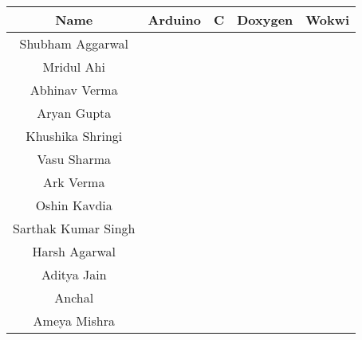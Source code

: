 \begin{center}
\label{table:competency_apd}
\begin{longtable}{|c|c|p{1.2cm}|c|c|}
\hline
Name                & Arduino                  & C                        & Doxygen                  & Wokwi                    \\ \hline
Shubham Aggarwal    & \cellcolor[HTML]{92D050} & \cellcolor[HTML]{00B050} & \cellcolor[HTML]{FFC000} & \cellcolor[HTML]{FFFF00} \\ \hline
Mridul Ahi          & \cellcolor[HTML]{92D050} & \cellcolor[HTML]{00B050} & \cellcolor[HTML]{F2F2F2} & \cellcolor[HTML]{F2F2F2} \\ \hline
Abhinav Verma       & \cellcolor[HTML]{92D050} & \cellcolor[HTML]{00B050} & \cellcolor[HTML]{FFC000} & \cellcolor[HTML]{FFC000} \\ \hline
Aryan Gupta         & \cellcolor[HTML]{FFFF00} & \cellcolor[HTML]{FFFF00} & \cellcolor[HTML]{F2F2F2} & \cellcolor[HTML]{F2F2F2} \\ \hline
Khushika Shringi    & \cellcolor[HTML]{92D050} & \cellcolor[HTML]{92D050} & \cellcolor[HTML]{F2F2F2} & \cellcolor[HTML]{FFC000} \\ \hline
Vasu Sharma         & \cellcolor[HTML]{FFFF00} & \cellcolor[HTML]{00B050} & \cellcolor[HTML]{F2F2F2} & \cellcolor[HTML]{FFC000} \\ \hline
Ark Verma           & \cellcolor[HTML]{FFFF00} & \cellcolor[HTML]{00B050} & \cellcolor[HTML]{F2F2F2} & \cellcolor[HTML]{F2F2F2} \\ \hline
Oshin Kavdia        & \cellcolor[HTML]{FFFF00} & \cellcolor[HTML]{00B050} & \cellcolor[HTML]{F2F2F2} & \cellcolor[HTML]{F2F2F2} \\ \hline
Sarthak Kumar Singh & \cellcolor[HTML]{FFFF00} & \cellcolor[HTML]{00B050} & \cellcolor[HTML]{F2F2F2} & \cellcolor[HTML]{F2F2F2} \\ \hline
Harsh Agarwal       & \cellcolor[HTML]{92D050} & \cellcolor[HTML]{92D050} & \cellcolor[HTML]{FFC000} & \cellcolor[HTML]{F2F2F2} \\ \hline
Aditya Jain       & \cellcolor[HTML]{92D050} & \cellcolor[HTML]{92D050} & \cellcolor[HTML]{FFC000} & \cellcolor[HTML]{FFFF00} \\ \hline
Anchal       & \cellcolor[HTML]{92D050} & \cellcolor[HTML]{92D050} & \cellcolor[HTML]{FFFF00} & \cellcolor[HTML]{FFFF00} \\ \hline
Ameya Mishra      & \cellcolor[HTML]{FFFF00} & \cellcolor[HTML]{92D050} & \cellcolor[HTML]{F2F2F2} & \cellcolor[HTML]{F2F2F2} \\ \hline

\end{longtable}
\end{center}
